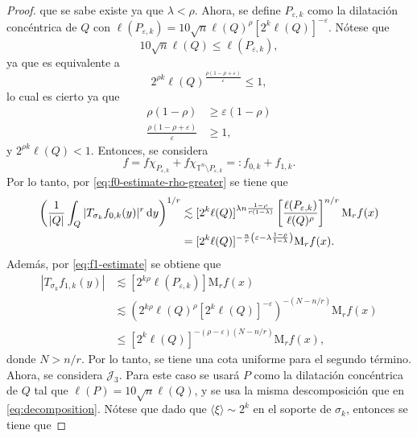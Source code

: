 \begin{proof}
que se sabe existe ya que $\lambda < \rho$. Ahora, se define $P_{\varepsilon, k}$ como la dilatación concéntrica de $Q$  con $\ell(P_{\varepsilon, k}) = 10 \sqrt{n}\ell(Q)^\rho [2^k\ell(Q)]^{-\varepsilon} $. Nótese que 
\begin{equation*}
	10\sqrt{n} \ell(Q) \leq \ell(P_{\varepsilon, k}),
\end{equation*}
ya que es equivalente a 
\begin{equation*}
	2^{\rho k} \ell(Q)^{\frac{\rho(1-\rho + \varepsilon)}{\varepsilon} } \leq 1, 
\end{equation*}
lo cual es cierto ya que 
\begin{align*}
	\rho(1-\rho) & \geq \varepsilon(1-\rho) \\
	\frac{\rho(1-\rho + \varepsilon)}{\varepsilon} & \geq 1,
\end{align*}
y $2^{\rho k}\ell(Q) < 1$. Entonces, se considera 
\begin{equation*}
	f = f\chi_{P_{\varepsilon, k}} + f\chi_{ \mathbb{T}^n\setminus P_{\varepsilon, k}} =: f_{0,k} + f_{1,k}.
\end{equation*}
Por lo tanto, por \cref{eq:f0-estimate-rho-greater} se tiene que 
\begin{align*}
	\left( \frac{1}{|Q|}\int_Q |T_{\sigma_k} f_{0, k}(y)|^r \mathop{}\!\mathrm{d} y 
	\right)^{1/r} & \lesssim [2^k\ell(Q)]^{\lambda n \frac{1-\rho}{r(1-\lambda)}} \left[ \frac{\ell(P_{\varepsilon, k}) }{\ell(Q)^\rho} \right]^{n/r} \mathrm{M}_rf(x)\\
	& =  [2^k\ell(Q)]^{-\frac{n}{r}\left(\varepsilon - \lambda \frac{1-\rho}{1-\lambda}\right)} \mathrm{M}_rf(x).
\end{align*}
Además, por \cref{eq:f1-estimate} se obtiene que
\begin{align*}
	|T_{\sigma_k}f_{1, k}(y)| & \lesssim [2^{k\rho}\ell(P_{\varepsilon,k})]\mathrm{M}_rf(x)\\
	& \lesssim\left( 2^{k\rho}\ell(Q)^\rho [2^k\ell(Q)]^{-\varepsilon} 
	\right)^{-(N-n/r)} \mathrm{M}_rf(x) \\
	& \leq [2^k\ell(Q)]^{-(\rho-\varepsilon)(N-n/r)}\mathrm{M}_rf(x),        
\end{align*}
donde $N>n/r$. Por lo tanto, se tiene una cota uniforme para el segundo término. Ahora, se considera $\mathcal{J}_3$. Para este caso se usará $P$ como la dilatación concéntrica de $Q$ tal que $\ell(P)=10\sqrt{n}\ell(Q)$, y se usa la misma descomposición que en \cref{eq:decomposition}. Nótese que dado que $\langle\xi\rangle \sim 2^k$ en el soporte de $\sigma_k$, entonces se tiene que

\end{proof}
